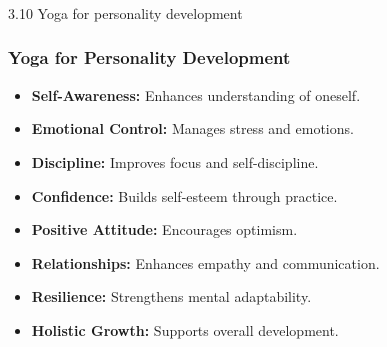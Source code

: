 \begin{frame}[fragile]\frametitle{}
\begin{center}
{\Large 3.10 Yoga for personality development}
\end{center}
\end{frame}

\begin{frame}[fragile]\frametitle{Yoga for Personality Development}

    \begin{itemize}
        \item \textbf{Self-Awareness:} Enhances understanding of oneself.
        \item \textbf{Emotional Control:} Manages stress and emotions.
        \item \textbf{Discipline:} Improves focus and self-discipline.
        \item \textbf{Confidence:} Builds self-esteem through practice.
        \item \textbf{Positive Attitude:} Encourages optimism.
        \item \textbf{Relationships:} Enhances empathy and communication.
        \item \textbf{Resilience:} Strengthens mental adaptability.
        \item \textbf{Holistic Growth:} Supports overall development.
    \end{itemize}

\end{frame}



